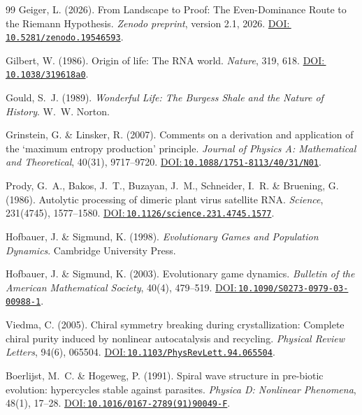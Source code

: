 \documentclass[12pt,a4paper]{article}
\newcommand{\doilink}[1]{\href{https://doi.org/#1}{DOI:\,\nolinkurl{#1}}}
\theoremstyle{remark}
\begin{document}
\begin{thebibliography}{99}
Geiger, L. (2026).
\newblock From Landscape to Proof: The Even-Dominance Route to the Riemann Hypothesis.
\newblock \textit{Zenodo preprint}, version 2.1, 2026.
\newblock \doilink{10.5281/zenodo.19546593}.

Gilbert, W. (1986).
\newblock Origin of life: The RNA world.
\newblock \textit{Nature}, 319, 618.
\newblock \doilink{10.1038/319618a0}.

Gould, S.~J. (1989).
\newblock \textit{Wonderful Life: The Burgess Shale and the Nature of History}.
\newblock W.~W. Norton.

Grinstein, G. \& Linsker, R. (2007).
\newblock Comments on a derivation and application of the `maximum entropy production' principle.
\newblock \textit{Journal of Physics A: Mathematical and Theoretical}, 40(31), 9717--9720.
\newblock \doilink{10.1088/1751-8113/40/31/N01}.

Prody, G.~A., Bakos, J.~T., Buzayan, J.~M., Schneider, I.~R. \& Bruening, G. (1986).
\newblock Autolytic processing of dimeric plant virus satellite RNA.
\newblock \textit{Science}, 231(4745), 1577--1580.
\newblock \doilink{10.1126/science.231.4745.1577}.

Hofbauer, J. \& Sigmund, K. (1998).
\newblock \textit{Evolutionary Games and Population Dynamics}.
\newblock Cambridge University Press.

Hofbauer, J. \& Sigmund, K. (2003).
\newblock Evolutionary game dynamics.
\newblock \textit{Bulletin of the American Mathematical Society}, 40(4), 479--519.
\newblock \doilink{10.1090/S0273-0979-03-00988-1}.

Viedma, C. (2005).
\newblock Chiral symmetry breaking during crystallization: Complete chiral purity induced by nonlinear autocatalysis and recycling.
\newblock \textit{Physical Review Letters}, 94(6), 065504.
\newblock \doilink{10.1103/PhysRevLett.94.065504}.

Boerlijst, M.~C. \& Hogeweg, P. (1991).
\newblock Spiral wave structure in pre-biotic evolution: hypercycles stable against parasites.
\newblock \textit{Physica D: Nonlinear Phenomena}, 48(1), 17--28.
\newblock \doilink{10.1016/0167-2789(91)90049-F}.


\end{thebibliography}
\end{document}

